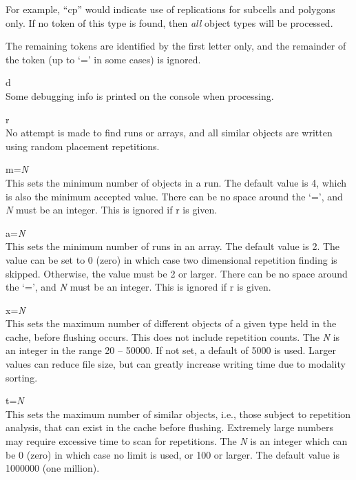 \begin{description}
\begin{description}
For example, ``{\vt cp}'' would indicate use of replications for
subcells and polygons only.  If no token of this type is found, then
{\it all} object types will be processed.
\end{description}

The remaining tokens are identified by the first letter only, and
the remainder of the token (up to `=' in some cases) is ignored.

\begin{description}
\item{\vt d}\\
Some debugging info is printed on the console when processing.

\item{\vt r}\\
No attempt is made to find runs or arrays, and all similar objects are
written using random placement repetitions.

\item{{\vt m}={\it N}}\\
This sets the minimum number of objects in a run.  The default value
is 4, which is also the minimum accepted value.  There can be no space
around the `=', and {\it N} must be an integer.  This is ignored if
{\vt r} is given.

\item{{\vt a}={\it N}}\\
This sets the minimum number of runs in an array.  The default value
is 2.  The value can be set to 0 (zero) in which case two dimensional
repetition finding is skipped.  Otherwise, the value must be 2 or
larger.  There can be no space around the `=', and {\it N} must be an
integer.  This is ignored if {\vt r} is given.

\item{{\vt x}={\it N}}\\
This sets the maximum number of different objects of a given type held
in the cache, before flushing occurs.  This does not include
repetition counts.  The {\it N} is an integer in the range 20 --
50000.  If not set, a default of 5000 is used.  Larger values can
reduce file size, but can greatly increase writing time due to
modality sorting.

\item{{\vt t}={\it N}}\\
This sets the maximum number of similar objects, i.e., those subject
to repetition analysis, that can exist in the cache before flushing. 
Extremely large numbers may require excessive time to scan for
repetitions.  The {\it N} is an integer which can be 0 (zero) in which
case no limit is used, or 100 or larger.  The default value is 1000000
(one million).
\end{description}


\end{description}
